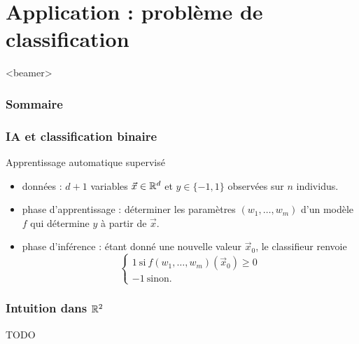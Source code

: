 \documentclass{beamer}
\newcommand{\R}{{\ensuremath\mathbb{R}}}
\begin{document}
\section{Application : problème de classification}

\begin{frame}<beamer>
  \frametitle{Sommaire}
  \tableofcontents[currentsection]
\end{frame}

\begin{frame}
  \frametitle{IA et classification binaire}

  \begin{block}{Apprentissage automatique supervisé}

    \begin{itemize}
      \item données : $d+1$ variables $\vec{x} \in \R^d$ et $y \in \{-1,1\}$ observées sur $n$ individus. 
      \item phase d'apprentissage : déterminer les paramètres $(w_1, \dots, w_m)$ d'un modèle $f$
        qui détermine $y$ à partir de $\vec{x}$.
      \item phase d'inférence : étant donné une nouvelle valeur $\vec{x}_0$,
        le classifieur renvoie
        \[
        \left\{
        \begin{array}{l} 1 \ \text{si} \ f(w_1, \dots, w_m)(\vec{x}_0) \geq 0 \\
          -1 \ \text{sinon}.
        \end{array}
        \right.
        \]
    \end{itemize}
    
  \end{block}

\end{frame}

\begin{frame}
  \frametitle{Intuition dans $\R^2$}

  TODO
  
\end{frame}
\end{document}
